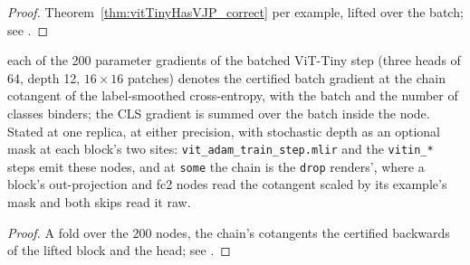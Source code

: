 \begin{proof}
\leanok
Theorem~\ref{thm:vitTinyHasVJP_correct} per example, lifted over the
batch; see .
\end{proof}

\begin{theorem}
  \label{thm:vit_step_tie}
  \leanok
  \Prove{} each of the 200 parameter gradients of the batched ViT-Tiny step
  (three heads of 64, depth 12, \(16 \times 16\) patches) denotes the
  certified batch gradient at the chain cotangent of the label-smoothed
  cross-entropy, with the batch and the number of classes binders; the CLS
  gradient is summed over the batch inside the node. Stated at one replica,
  at either precision, with stochastic depth as an optional mask at each
  block's two sites: \texttt{vit\_adam\_train\_step.mlir} and the
  \texttt{vitin\_*} steps emit these nodes, and at \texttt{some} the chain
  is the \texttt{drop} renders', where a block's out-projection and fc2
  nodes read the cotangent scaled by its example's mask and both skips read
  it raw.
\end{theorem}

\begin{proof}
\leanok
A fold over the 200 nodes, the chain's cotangents the certified backwards
of the lifted block and the head; see
.
\end{proof}

